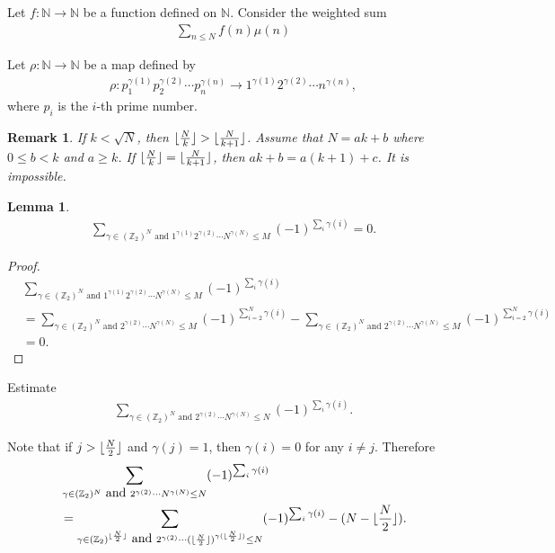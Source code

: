 \documentclass[a4paper,10pt]{amsart}
\newtheorem{lemma}{Lemma}[section]
\newtheorem{remark}{Remark}[section]
\newcommand{\Z}{\mathbb Z} %
\newcommand{\N}{\mathbb N} %
\DeclarePairedDelimiter\floor{\lfloor}{\rfloor}
\begin{document}
Let $f: \N \rightarrow \N$ be a function defined on $\N$.
Consider the weighted sum
\begin{align*}
    \sum_{n \leq N}f(n)\mu(n) 
\end{align*}

Let $\rho: \N \rightarrow \N$ be a map defined by
\begin{align*}
\rho : p_{1}^{\gamma(1)}p_{2}^{\gamma(2)}\cdots p_{n}^{\gamma(n)} 
\rightarrow
1^{\gamma(1)}2^{\gamma(2)}\cdots n^{\gamma(n)}, 
\end{align*}
where $p_i$ is the $i$-th prime number.

\begin{remark}
    If $k< \sqrt{N}$, then $\floor{\frac{N}{k}} > \floor{\frac{N}{k+1}}$. 
    Assume that $N = ak + b$ where $0 \leq b < k$ and $a \geq k$. 
    If $\floor{\frac{N}{k}} = \floor{\frac{N}{k+1}}$, then
    $ak+ b = a(k+1)+c$. It is impossible.
\end{remark}

\begin{lemma}
 \begin{align*}
    \sum_{\gamma \in (\Z_{2})^{N} \mbox{ and } 
    1^{\gamma(1)}2^{\gamma(2)}\cdots N^{\gamma(N)} \leq M} 
    (-1)^{\sum_{i}\gamma(i)} = 0.
\end{align*}
\end{lemma}

\begin{proof}
  \begin{align*}
    &\sum_{\gamma \in (\Z_{2})^{N} \mbox{ and } 
    1^{\gamma(1)}2^{\gamma(2)}\cdots N^{\gamma(N)} \leq M} 
    (-1)^{\sum_{i}\gamma(i)} \\
    & = \sum_{\gamma \in (\Z_{2})^{N} \mbox{ and } 
    2^{\gamma(2)}\cdots N^{\gamma(N)} \leq M} 
    (-1)^{\sum_{i=2}^{N}\gamma(i)}
    - \sum_{\gamma \in (\Z_{2})^{N} \mbox{ and } 
    2^{\gamma(2)}\cdots N^{\gamma(N)} \leq M} 
    (-1)^{\sum_{i=2}^{N}\gamma(i)} \\
    &= 0.
\end{align*}
\end{proof}

Estimate
 \begin{align*}
    \sum_{\gamma \in (\Z_{2})^{N} \mbox{ and } 
    2^{\gamma(2)}\cdots N^{\gamma(N)} \leq N} 
    (-1)^{\sum_{i}\gamma(i)}.
\end{align*}

Note that if $j > \floor{\frac{N}{2}}$ and $\gamma(j) = 1$, 
    then $\gamma(i) = 0$ for any $i \neq j$. 
    Therefore
    \begin{align*}
        &\sum_{\gamma \in (\Z_{2})^{N} \mbox{ and } 
        2^{\gamma(2)}\cdots N^{\gamma(N)} \leq N} 
        (-1)^{\sum_{i}\gamma(i)}\\ 
        &= \sum_{\gamma \in (\Z_{2})^{\floor{\frac{N}{2}}} \mbox{ and } 
        2^{\gamma(2)}\cdots 
        (\floor{\frac{N}{2}})^{\gamma(\floor{\frac{N}{2}})} \leq N} 
        (-1)^{\sum_{i}\gamma(i)} - (N- \floor{\frac{N}{2}}). 
    \end{align*}
\end{document}

